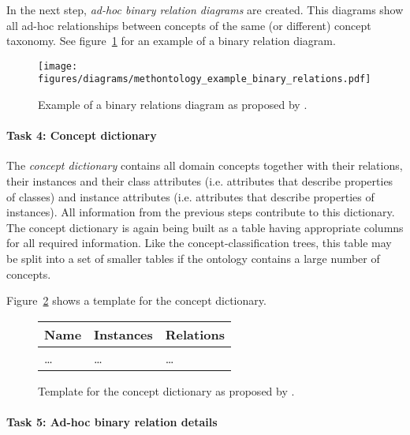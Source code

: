 In the next step, \emph{ad-hoc binary relation diagrams} are created. This diagrams show all ad-hoc relationships between concepts of the same (or different) concept taxonomy. See figure~\ref{fig:methontology_example_binary_relations} for an example of a binary relation diagram.

\begin{figure}
\centering
\texttt{[image: figures/diagrams/methontology\_example\_binary\_relations.pdf]}
\caption{Example of a binary relations diagram as proposed by \methontology.}
\label{fig:methontology_example_binary_relations}
\end{figure}

\paragraph{Task 4: Concept dictionary}

The \emph{concept dictionary} contains all domain concepts together with their relations, their instances and their class attributes (i.e. attributes that describe properties of classes) and instance attributes (i.e. attributes that describe properties of instances). All information from the previous steps contribute to this dictionary. The concept dictionary is again being built as a table having appropriate columns for all required information. Like the concept-classification trees, this table may be split into a set of smaller tables if the ontology contains a large number of concepts.

Figure~\ref{fig:methontology_example_concept_dictionary} shows a template for the concept dictionary.

\begin{figure}
\centering
\begin{tabular}{|p{}|p{}|p{}|}
  \hline
  \textbf{Name} & \textbf{Instances} & \textbf{Relations} \\
  \hline\hline
  … & … & … \\
  \hline
\end{tabular}
\caption{Template for the concept dictionary as proposed by \methontology.}
\label{fig:methontology_example_concept_dictionary}
\end{figure}

\paragraph{Task 5: Ad-hoc binary relation details}

